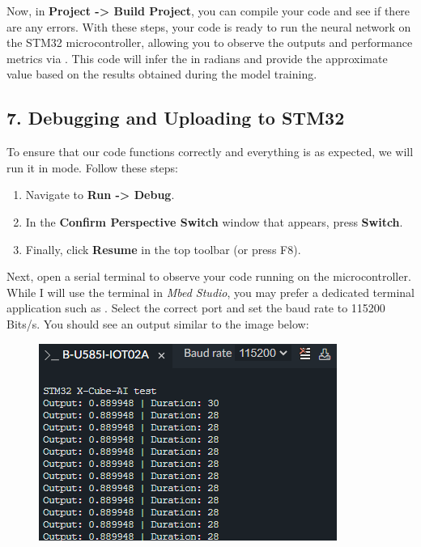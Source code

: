 \documentclass[10pt,a4paper,onecolumn]{article}
\let\textttOrig=\texttt
\def\texttt#1{\expandafter\textttOrig{\seqsplit{#1}}}
\providecommand{\tightlist}{%
  \setlength{\itemsep}{0pt}\setlength{\parskip}{0pt}}
\begin{document}
Now, in \textbf{Project -\textgreater{} Build Project}, you can compile
your code and see if there are any errors. With these steps, your code
is ready to run the neural network on the STM32 microcontroller,
allowing you to observe the outputs and performance metrics via
\texttt{UART}. This code will infer the \texttt{sin(2.0)} in radians and
provide the approximate value based on the results obtained during the
model training.

\hypertarget{debugging-and-uploading-to-stm32}{%
\subsection{7. Debugging and Uploading to
STM32}\label{debugging-and-uploading-to-stm32}}

To ensure that our code functions correctly and everything is as
expected, we will run it in \texttt{Debug} mode. Follow these steps:

\begin{enumerate}
\def\labelenumi{\arabic{enumi}.}
\tightlist
\item
  Navigate to \textbf{Run -\textgreater{} Debug}.
\item
  In the \textbf{Confirm Perspective Switch} window that appears, press
  \textbf{Switch}.
\item
  Finally, click \textbf{Resume} in the top toolbar (or press F8).
\end{enumerate}

Next, open a serial terminal to observe your code running on the
microcontroller. While I will use the terminal in \textit{Mbed Studio},
you may prefer a dedicated terminal application such as \texttt{PuTTY}.
Select the correct port and set the baud rate to 115200 Bits/s. You
should see an output similar to the image below:

\begin{figure}[H]
  \begin{center}
    \includegraphics[width=\dimexpr\textwidth-1cm\relax,height=\dimexpr0.25\textheight-3cm\relax,keepaspectratio]{images/51.png}
  \end{center}
\end{figure}
\end{document}

